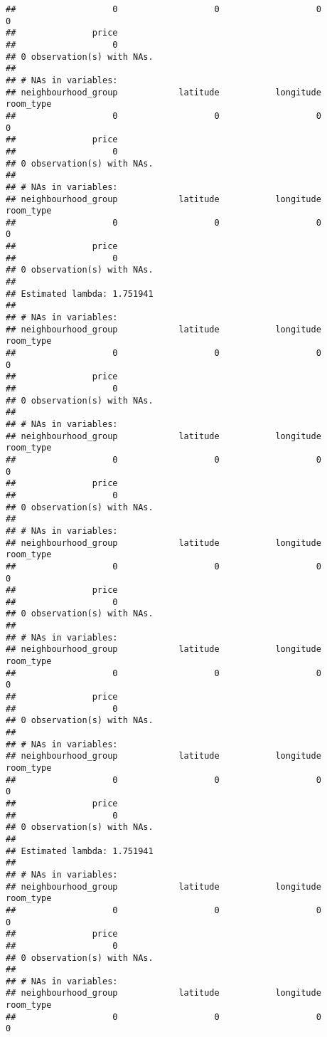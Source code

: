 \documentclass[
]{article}
\begin{document}
\begin{verbatim}
##                   0                   0                   0                   0 
##               price 
##                   0 
## 0 observation(s) with NAs.
## 
## # NAs in variables:
## neighbourhood_group            latitude           longitude           room_type 
##                   0                   0                   0                   0 
##               price 
##                   0 
## 0 observation(s) with NAs.
## 
## # NAs in variables:
## neighbourhood_group            latitude           longitude           room_type 
##                   0                   0                   0                   0 
##               price 
##                   0 
## 0 observation(s) with NAs.
## 
## Estimated lambda: 1.751941 
## 
## # NAs in variables:
## neighbourhood_group            latitude           longitude           room_type 
##                   0                   0                   0                   0 
##               price 
##                   0 
## 0 observation(s) with NAs.
## 
## # NAs in variables:
## neighbourhood_group            latitude           longitude           room_type 
##                   0                   0                   0                   0 
##               price 
##                   0 
## 0 observation(s) with NAs.
## 
## # NAs in variables:
## neighbourhood_group            latitude           longitude           room_type 
##                   0                   0                   0                   0 
##               price 
##                   0 
## 0 observation(s) with NAs.
## 
## # NAs in variables:
## neighbourhood_group            latitude           longitude           room_type 
##                   0                   0                   0                   0 
##               price 
##                   0 
## 0 observation(s) with NAs.
## 
## # NAs in variables:
## neighbourhood_group            latitude           longitude           room_type 
##                   0                   0                   0                   0 
##               price 
##                   0 
## 0 observation(s) with NAs.
## 
## Estimated lambda: 1.751941 
## 
## # NAs in variables:
## neighbourhood_group            latitude           longitude           room_type 
##                   0                   0                   0                   0 
##               price 
##                   0 
## 0 observation(s) with NAs.
## 
## # NAs in variables:
## neighbourhood_group            latitude           longitude           room_type 
##                   0                   0                   0                   0 

\end{verbatim}
\end{document}
